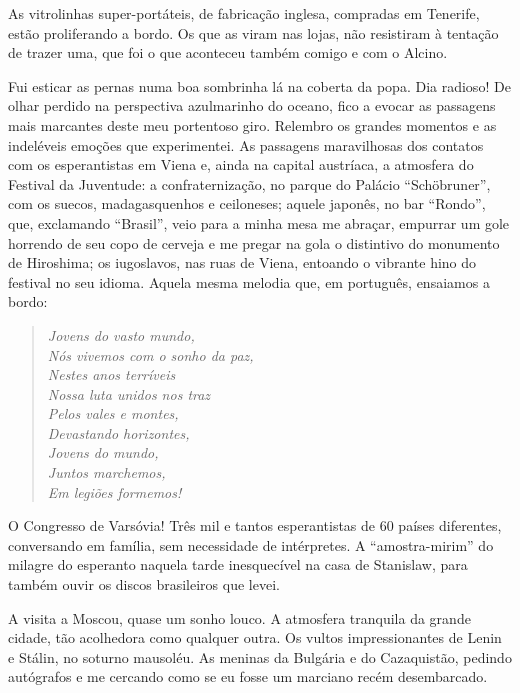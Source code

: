 As vitrolinhas super-portáteis, de fabricação inglesa, compradas em Tenerife, estão proliferando a bordo. Os que as viram nas lojas, não resistiram à tentação de trazer uma, que foi o que aconteceu também comigo e com o Alcino.

Fui esticar as pernas numa boa sombrinha lá na coberta da popa. Dia radioso! De olhar perdido na perspectiva azulmarinho do oceano, fico a evocar as passagens mais marcantes deste meu portentoso giro. Relembro os grandes momentos e as indeléveis emoções que experimentei. As passagens maravilhosas dos contatos com os esperantistas em Viena e, ainda na capital austríaca, a atmosfera do Festival da Juventude: a confraternização, no parque do Palácio ``Schöbruner'', com os suecos, madagasquenhos e ceiloneses; aquele japonês, no bar ``Rondo'', que, exclamando ``Brasil'', veio para a minha mesa me abraçar, empurrar um gole horrendo de seu copo de cerveja e me pregar na gola o distintivo do monumento de Hiroshima; os iugoslavos, nas ruas de Viena, entoando o vibrante hino do festival no seu idioma. Aquela mesma melodia que, em português, ensaiamos a bordo:

\begin{verse}
\emph{Jovens do vasto mundo,\\
Nós vivemos com o sonho da paz,\\
Nestes anos terríveis\\
Nossa luta unidos nos traz\\
Pelos vales e montes,\\
Devastando horizontes,\\
Jovens do mundo,\\
Juntos marchemos,\\
Em legiões formemos!}
\end{verse}

O Congresso de Varsóvia! Três mil e tantos esperantistas de 60 países diferentes, conversando em família, sem necessidade de intérpretes. A ``amostra-mirim'' do milagre do esperanto naquela tarde inesquecível na casa de Stanislaw, para também ouvir os discos brasileiros que levei.

A visita a Moscou, quase um sonho louco. A atmosfera tranquila da grande cidade, tão acolhedora como qualquer outra. Os vultos impressionantes de Lenin e Stálin, no soturno mausoléu. As meninas da Bulgária e do Cazaquistão, pedindo autógrafos e me cercando como se eu fosse um marciano recém desembarcado.

